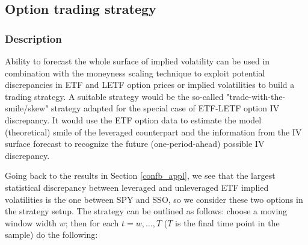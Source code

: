 \documentclass{rQUF2e}
\theoremstyle{plain}
\theoremstyle{definition}
\begin{document}
	
	\subsection{Option trading strategy}
	
	\subsubsection{Description} 
	\label{stratdescr}
	
	Ability to forecast the whole surface of implied volatility can be used in combination with the moneyness scaling technique to exploit potential discrepancies in ETF and LETF option prices or implied volatilities to build a trading strategy. A suitable strategy would be the so-called "trade-with-the-smile/skew" strategy adapted for the special case of ETF-LETF option IV discrepancy. It would use the ETF option data to estimate the model (theoretical) smile of the leveraged counterpart and the information from the IV surface forecast to recognize the future (one-period-ahead) possible IV discrepancy. 
	
	Going back to the results in Section \ref{confb_appl}, we see that the largest statistical discrepancy between leveraged and unleveraged ETF implied volatilities is the one between SPY and SSO, so we consider these two options in the strategy setup. The strategy can be outlined as follows: choose a moving window width $w$; then for each $t = w,\ldots,T$ ($T$ is the final time point in the sample) do the following: 
	
\end{document}
